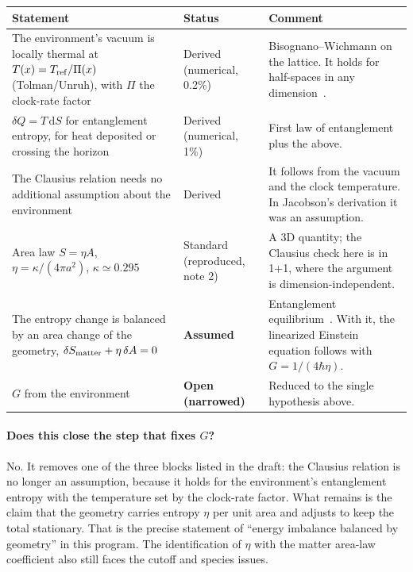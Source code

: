 \documentclass[11pt]{article}
\newcommand{\Pg}{\Pi}
\newcommand{\dd}{\mathrm{d}}
\begin{document}
\begin{longtable}{@{}>{\raggedright\arraybackslash}p{}>{\raggedright\arraybackslash}p{}>{\raggedright\arraybackslash}p{}@{}}
\toprule
Statement & Status & Comment \\
\midrule
The environment's vacuum is locally thermal at $T(x)=T_{\rm ref}/\Pg(x)$ (Tolman/Unruh), with $\Pg$ the clock-rate factor & Derived (numerical, 0.2\%) & Bisognano--Wichmann on the lattice. It holds for half-spaces in any dimension~\cite{BW1976}. \\
$\delta Q=T\,\dd S$ for entanglement entropy, for heat deposited or crossing the horizon & Derived (numerical, 1\%) & First law of entanglement plus the above. \\
The Clausius relation needs no additional assumption about the environment & Derived & It follows from the vacuum and the clock temperature. In Jacobson's derivation it was an assumption. \\
Area law $S=\eta A$, $\eta=\kappa/(4\pi a^2)$, $\kappa\simeq0.295$ & Standard (reproduced, note 2) & A 3D quantity; the Clausius check here is in 1+1, where the argument is dimension-independent. \\
The entropy change is balanced by an area change of the geometry, $\delta S_{\rm matter}+\eta\,\delta A=0$ & \textbf{Assumed} & Entanglement equilibrium~\cite{Jacobson2016}. With it, the linearized Einstein equation follows with $G=1/(4\hbar\eta)$. \\
$G$ from the environment & \textbf{Open (narrowed)} & Reduced to the single hypothesis above. \\
\bottomrule
\end{longtable}

\paragraph{Does this close the step that fixes $G$?} No. It removes one of the three blocks listed in the draft: the Clausius relation is no longer an assumption, because it holds for the environment's entanglement entropy with the temperature set by the clock-rate factor. What remains is the claim that the geometry carries entropy $\eta$ per unit area and adjusts to keep the total stationary. That is the precise statement of ``energy imbalance balanced by geometry'' in this program. The identification of $\eta$ with the matter area-law coefficient also still faces the cutoff and species issues.
\end{document}
